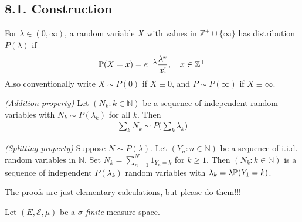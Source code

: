 \documentclass[12pt,a4paper]{report}
\begin{document}
\subsection*{8.1. Construction}

For $\lambda \in (0,\infty)$, a random variable $X$ with values in $\mathbb{Z}^+ \cup \{\infty \}$ has distribution $P(\lambda)$ if
\begin{align*}
\mathbb{P}(X = x) = e^{-\lambda} \frac{\lambda^x}{x!}, \quad x\in \mathbb{Z}^+
\end{align*}
Also conventionally write $X \sim P(0)$ if $X \equiv 0$, and $P \sim P(\infty) $ if $X \equiv \infty$.
\s

\emph{(Addition property)} Let $(N_k : k\in \mathbb{N})$ be a sequence of independent random variables with $N_k \sim P(\lambda_k)$ for all $k$. Then 
\begin{align*}
\sum_{k} N_k \sim P \big( \sum_k \lambda_k \big)
\end{align*}
\s

\emph{(Splitting property)} Suppose $N\sim P(\lambda)$. Let $(Y_n : n\in \mathbb{N})$ be a sequence of i.i.d. random variables in $\mathbb{N}$. Set $N_k = \sum_{n=1}^N 1_{Y_n =k}$ for $k\geq 1$. Then $(N_k : k\in \mathbb{N})$ is a sequence of independent $P(\lambda_k)$ random variables with $\lambda_k = \lambda \mathbb{P}(Y_1 =k)$.
\s

The proofs are just elementary calculations, but please do them!!!
\s

Let $(E, \mathscr{E}, \mu)$ be a \emph{$\sigma$-finite} measure space.
\end{document}
